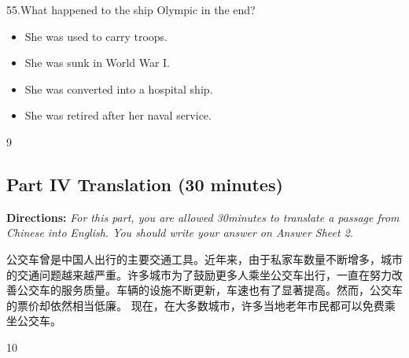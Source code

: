 \documentclass[UTF8,11pt]{ctexart}
\begin{document}
55.What happened to the ship Olympic in the end?


\begin{itemize}[leftmargin=2em,itemsep=.2em,topsep=.4em]\item[A.] She was used to carry troops.
\item[B.] She was sunk in World War I.
\item[C.] She was converted into a hospital ship.
\item[D.] She was retired after her naval service.
\end{itemize}

9


\subsection*{\textbf{Part IV} \textbf{Translation} \textbf{(30 minutes)}}


\textbf{Directions:}\textit{ For this part, you are allowed 30minutes to translate a passage from Chinese} \textit{into} \textit{English. You should write your answer on Answer Sheet 2.}


公交车曾是中国人出行的主要交通工具。近年来，由于私家车数量不断增多，城市的交通问题越来越严重。许多城市为了鼓励更多人乘坐公交车出行，一直在努力改善公交车的服务质量。车辆的设施不断更新，车速也有了显著提高。然而，公交车的票价却依然相当低廉。 现在，在大多数城市，许多当地老年市民都可以免费乘坐公交车。


10
\end{document}
